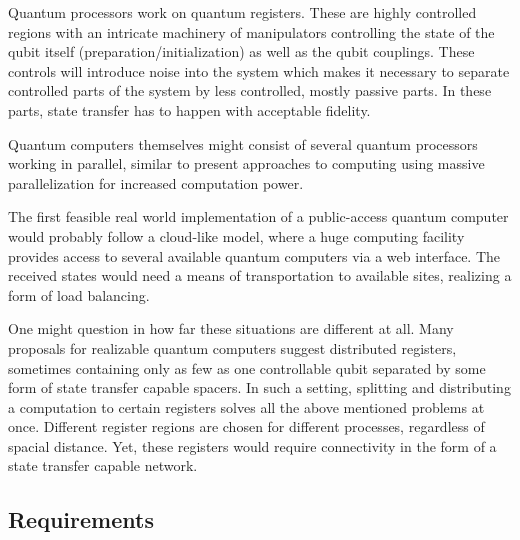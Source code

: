 \noindent Quantum processors work on quantum registers. These are highly controlled regions with an intricate machinery of manipulators controlling the state of the qubit itself (preparation/initialization) as well as the qubit couplings. These controls will introduce noise into the system which makes it necessary to separate controlled parts of the system by less controlled, mostly passive parts\cite{Bose2014}. In these parts, state transfer has to happen with acceptable fidelity.\par
Quantum computers themselves might consist of several quantum processors working in parallel, similar to present approaches to computing using massive parallelization for increased computation power.\par
The first feasible real world implementation of a public-access quantum computer would probably follow a cloud-like model, where a huge computing facility provides access to several available quantum computers via a web interface. The received states would need a means of transportation to available sites, realizing a form of load balancing.\par
One might question in how far these situations are different at all. Many proposals for realizable quantum computers suggest distributed registers, sometimes containing only as few as one controllable qubit separated by some form of state transfer capable spacers\cite{Beals2013}. In such a setting, splitting and distributing a computation to certain registers solves all the above mentioned problems at once. Different register regions are chosen for different processes, regardless of spacial distance. Yet, these registers would require connectivity in the form of a state transfer capable network. 

\subsection{Requirements}

